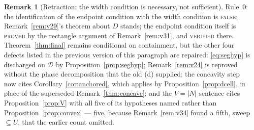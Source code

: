 \documentclass[11pt]{article}
\theoremstyle{definition}
\newtheorem{remark}[theorem]{Remark}
\begin{document}
\begin{remark}[Retraction: the width condition is necessary, not sufficient]
Rule~0: the identification of the endpoint condition with the width condition is
\textsc{false}; Remark~\ref{rem:v29}'s theorem about $D$ stands; the endpoint condition itself
is \textsc{proved} by the rectangle argument of Remark~\ref{rem:v31}, and \textsc{verified}
there. Theorem~\ref{thm:final} remains conditional on containment, but the other four defects
listed in the previous version of this paragraph are repaired: \eqref{eq:seghyp} is discharged
on $\mathcal D$ by Proposition~\ref{prop:seghyp}; Remark~\ref{rem:v24} is reproved without the
phase decomposition that the old (d) supplied; the concavity step now cites
Corollary~\ref{cor:anchored}, which applies by Proposition~\ref{prop:dcell}, in place of the
superseded Remark~\ref{thm:concave}; and the $V=|N|$ sentence cites
Proposition~\ref{prop:V} with all five of its hypotheses named rather than
Proposition~\ref{prop:convex} --- five, because Remark~\ref{rem:v34} found a fifth,
sweep $\subseteq U$, that the earlier count omitted.
\end{remark}
\end{document}
